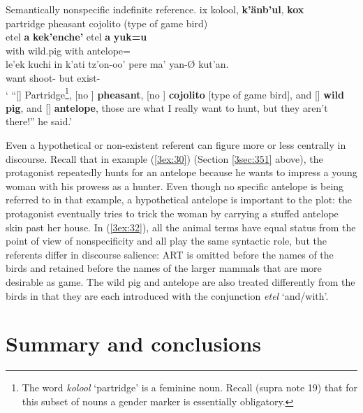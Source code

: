 \documentclass[output=paper]{langsci/langscibook}
\begin{document}
\filbreak
\begin{exe}
\ex\label{3ex:32}
Semantically nonspecific indefinite reference. 
\exi{}
\gll	ix			kolool,	{\bf{k'\"anb'ul}},	{\bf{kox}} \\
	{}		partridge	pheasant		{cojolito (type of game bird)} \\
\glt
\exi{}
\gll	etel	{\bf{a}}	{\bf{kek'enche'}}	etel	{\bf{a}}	{\bf{yuk=u}} \\
	with	{}	wild.pig			with	{}	antelope={} \\
\glt
\exi{}
\gll	le'ek			kuchi			in		k'ati		tz'on-oo' 			pere		ma'		yan-{\O}		kut'an.\\
	{}	{}		{}	want		shoot-{} 	but		{}	exist-{}	{} \\
\glt	` ``[{}] Partridge\footnote{The word {\emph{kolool}} `partridge' is a feminine noun.  Recall (supra note 19) that for this subset of nouns a gender marker is essentially obligatory.}, [no {}] {\bf{pheasant}}, [no {}] {\bf{cojolito}} [type of game bird], and [{}] {\bf{wild pig}}, and [{}] {\bf{antelope}}, those are what I really want to hunt, but they aren't there!'' he said.'
\end{exe}

Even a hypothetical or non-existent referent can figure more or less centrally in discourse.  Recall that in example (\ref{3ex:30}) (Section \ref{3sec:351} above), the protagonist repeatedly hunts for an antelope because he wants to impress a young woman with his prowess as a hunter.  Even though no specific antelope is being referred to in that example, a hypothetical antelope is important to the plot: the protagonist eventually tries to trick the woman by carrying a stuffed antelope skin past her house. In (\ref{3ex:32}), all the animal terms have equal status from the point of view of nonspecificity and all play the same syntactic role, but the referents differ in discourse salience: ART is omitted before the names of the birds and retained before the names of the larger mammals that are more desirable as game.  The wild pig and antelope are also treated differently from the birds in that they are each introduced with the conjunction {\emph{etel}} `and/with'.


\section{Summary and conclusions}\label{3sec:4}
\end{document}
